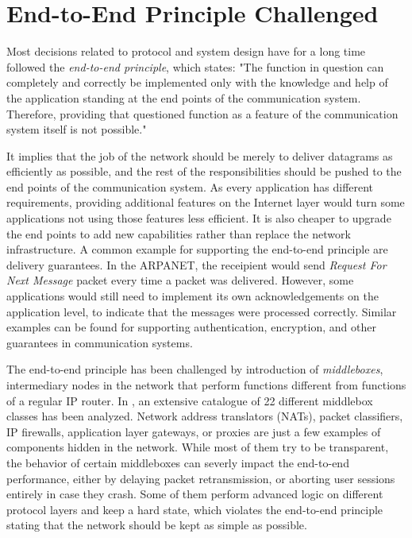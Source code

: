 
\section{End-to-End Principle Challenged}

Most decisions related to protocol and system design have for a long time followed the \textit{end-to-end principle}, which states: "The function in question can completely and correctly be implemented only with the knowledge and help of the application standing at the end points of the communication system. Therefore, providing that questioned function as a feature of the communication system itself is not possible." \cite{endtoend}

It implies that the job of the network should be merely to deliver datagrams as efficiently as possible, and the rest of the responsibilities should be pushed to the end points of the communication system. As every application has different requirements, providing additional features on the Internet layer would turn some applications not using those features less efficient. It is also cheaper to upgrade the end points to add new capabilities rather than replace the network infrastructure. A common example for supporting the end-to-end principle are delivery guarantees. In the ARPANET, the receipient would send \textit{Request For Next Message} packet every time a packet was delivered. However, some applications would still need to implement its own acknowledgements on the application level, to indicate that the messages were processed correctly. Similar examples can be found for supporting authentication, encryption, and other guarantees in communication systems.

The end-to-end principle has been challenged by introduction of \textit{middleboxes}, intermediary nodes in the network that perform functions different from functions of a regular IP router. In \cite{rfc3234}, an extensive catalogue of 22 different middlebox classes has been analyzed. Network address translators (NATs), packet classifiers, IP firewalls, application layer gateways, or proxies are just a few examples of components hidden in the network. While most of them try to be transparent, the behavior of certain middleboxes can severly impact the end-to-end performance, either by delaying packet retransmission, or aborting user sessions entirely in case they crash. Some of them perform advanced logic on different protocol layers and keep a hard state, which violates the end-to-end principle stating that the network should be kept as simple as possible.

